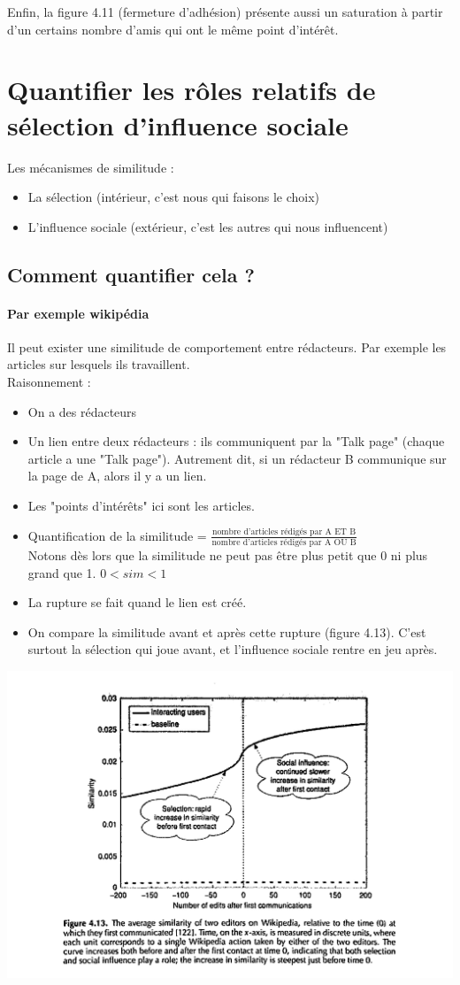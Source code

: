Enfin, la figure 4.11 (fermeture d'adhésion) présente aussi un saturation à partir d'un certains nombre d'amis qui ont le même point d'intérêt.

\section{Quantifier les rôles relatifs de sélection d'influence sociale}
Les mécanismes de similitude :
\begin{itemize}
\item La sélection (intérieur, c'est nous qui faisons le choix)
\item L'influence sociale (extérieur, c'est les autres qui nous influencent) 
\end{itemize}
\subsection{Comment quantifier cela ?}
\paragraph*{Par exemple wikipédia}
Il peut exister une similitude de comportement entre rédacteurs. Par exemple les articles sur lesquels ils travaillent.\\
Raisonnement :
\begin{itemize}
\item On a des rédacteurs
\item Un lien entre deux rédacteurs : ils communiquent par la "Talk page" (chaque article a une "Talk page"). Autrement dit, si un rédacteur B communique sur la page de A, alors il y a un lien.
\item Les "points d'intérêts" ici sont les articles.
\item Quantification de la similitude = $\displaystyle\frac{\mbox{nombre d'articles rédigés par A ET B}}{\mbox{nombre d'articles rédigés par A OU B}}$\\
Notons dès lors que la similitude ne peut pas être plus petit que 0 ni plus grand que 1. $0 < sim < 1$
\item La rupture se fait quand le lien est créé. %
\item On compare la similitude avant et après cette rupture (figure 4.13). C'est surtout la sélection qui joue avant, et l'influence sociale rentre en jeu après.
\end{itemize}

\includegraphics[width=\textwidth]{images/wikipedia.jpg}